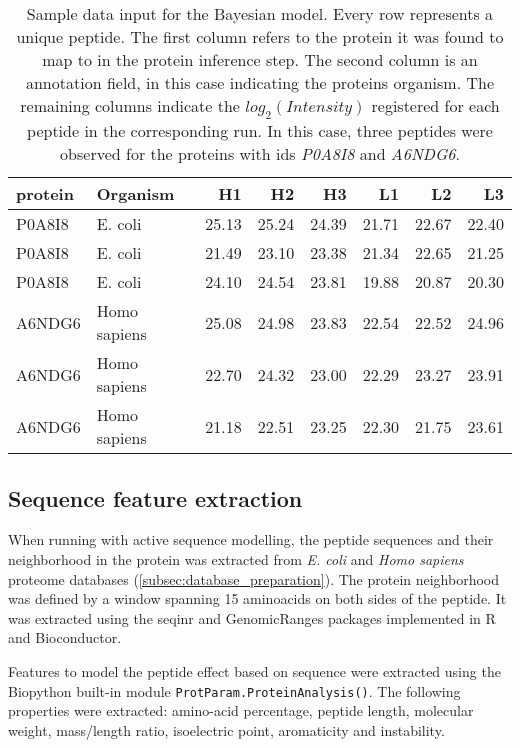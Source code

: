 \begin{table}
\begin{tabular}{llrrrrrr}
\toprule
protein &      Organism &     H1 &     H2 &     H3 &     L1 &     L2 &     L3 \\
\midrule
 P0A8I8 &       E. coli &  25.13 &  25.24 &  24.39 &  21.71 &  22.67 &  22.40 \\
 P0A8I8 &       E. coli &  21.49 &  23.10 &  23.38 &  21.34 &  22.65 &  21.25 \\
 P0A8I8 &       E. coli &  24.10 &  24.54 &  23.81 &  19.88 &  20.87 &  20.30 \\
 A6NDG6 &  Homo sapiens &  25.08 &  24.98 &  23.83 &  22.54 &  22.52 &  24.96 \\
 A6NDG6 &  Homo sapiens &  22.70 &  24.32 &  23.00 &  22.29 &  23.27 &  23.91 \\
 A6NDG6 &  Homo sapiens &  21.18 &  22.51 &  23.25 &  22.30 &  21.75 &  23.61 \\
\bottomrule
\end{tabular}
\caption{Sample data input for the Bayesian model. Every row represents a unique peptide. The first column refers to the protein it was found to map to in the protein inference step. The second column is an annotation field, in this case indicating the protein\textquotesingle s organism. The remaining columns indicate the $log_2(Intensity)$ registered for each peptide in the corresponding run. In this case, three peptides were observed for the proteins with ids \textit{P0A8I8} and \textit{A6NDG6}.}
\label{tab:data_model}
\end{table}

\subsection{Sequence feature extraction}

When running with active sequence modelling, the peptide sequences and their neighborhood in the protein was extracted from \textit{E. coli} and \textit{Homo sapiens} proteome databases (\ref{subsec:database_preparation}). The protein neighborhood was defined by a window spanning 15 aminoacids on both sides of the peptide. It was extracted using the seqinr \cite{Charif2007} and GenomicRanges \cite{Lawrence2013} packages implemented in R and Bioconductor.

Features to model the peptide effect based on sequence were extracted using the Biopython \cite{Cock2009} built-in  module \texttt{ProtParam.ProteinAnalysis()}. The following properties were extracted: amino-acid percentage, peptide length, molecular weight, mass/length ratio, isoelectric point, aromaticity and instability.

